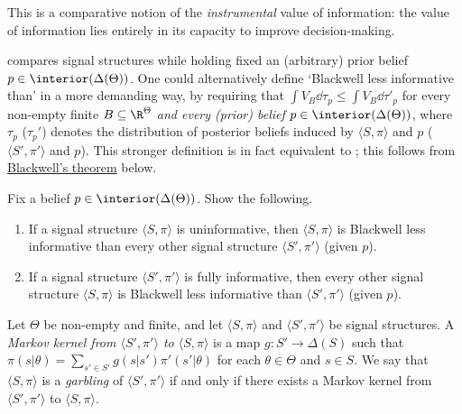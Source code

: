 This is a comparative notion of the \emph{instrumental} value of information: the value of information lies entirely in its capacity to improve decision-making.

\begin{remark}
	\label{remark:blackwell_priors}
	 compares signal structures while holding fixed an (arbitrary) prior belief $p \in \interior(\Delta(\Theta))$. One could alternatively define `Blackwell less informative than' in a more demanding way, by requiring that $\int V_B \dd \tau_p \leq \int V_B \dd \tau'_p$ for every non-empty finite $B \subseteq \R^\Theta$ \emph{and every (prior) belief $p \in \interior(\Delta(\Theta))$}, where $\tau_p$ ($\tau_p'$) denotes the distribution of posterior beliefs induced by $\langle S, \pi \rangle $ and $p$ ($\langle S', \pi' \rangle $ and $p$). This stronger definition is in fact equivalent to ; this follows from \hyperref[theorem:blackwell]{Blackwell's theorem} below.
\end{remark}

\begin{namedthm}[\Cref*{exercise:fullnoinfo} {\normalfont (continued).}]
	\label{exercise:fullnoinfo_lessinfo}
	Fix a belief $p \in \interior(\Delta(\Theta))$. Show the following.

	\begin{enumerate}[label=(\alph*)]

		\item If a signal structure $\langle S, \pi \rangle $ is uninformative, then $\langle S, \pi \rangle $ is Blackwell less informative than every other signal structure $\langle S', \pi' \rangle $ (given $p$).
	
		\item If a signal structure $\langle S', \pi' \rangle $ is fully informative, then every other signal structure $\langle S, \pi \rangle $ is Blackwell less informative than $\langle S', \pi' \rangle $ (given $p$).
	
	\end{enumerate}
\end{namedthm}

\begin{definition}
	\label{definition:garbling}
	Let $\Theta$ be non-empty and finite, and let $\langle S, \pi \rangle $ and $\langle S', \pi' \rangle $ be signal structures. A \emph{Markov kernel from $\langle S', \pi' \rangle $ to $\langle S, \pi \rangle $} is a map $g : S' \to \Delta(S)$ such that $\pi(s|\theta) = \sum_{s' \in S'} g(s|s') \pi'(s'|\theta)$ for each $\theta \in \Theta$ and $s \in S$. We say that $\langle S, \pi \rangle $ is a \emph{garbling} of $\langle S', \pi' \rangle $ if and only if there exists a Markov kernel from $\langle S', \pi' \rangle $ to $\langle S, \pi \rangle $.
\end{definition}

